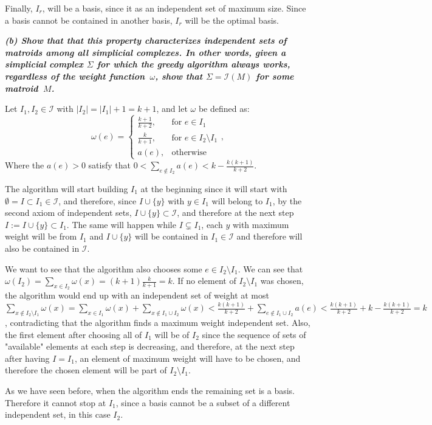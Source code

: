 Finally, $I_r$, will be a basis, since it as an independent set of maximum size. Since a basis cannot be contained in another basis, $I_r$ will be the optimal basis.
\vspace{3pt}

\hspace{5pt}\textbf{\textit{(b) Show that that this property characterizes independent sets of matroids among all simplicial complexes. In other words, given a simplicial complex $\Sigma$ for which the greedy algorithm always works, regardless of the weight function~$\omega$, show that $\Sigma = \mathcal I(M)$ for some matroid~$M$.}}

\vspace{3pt}

Let $I_1, I_2 \in \mathcal I$ with $|I_2| = |I_1| + 1 = k + 1$, and let $\omega$ be defined as:
\[
\omega(e) = \left\{
\begin{array}{lr}
	\frac{k+1}{k+2}, & \text{for } e \in I_1 \\
	\frac{k}{k+1}, & \text{for } e \in I_2 \setminus I_1\\
    a(e), & \text{otherwise }
\end{array}
\right. ,
\]
Where the $a(e) > 0$ satisfy that $0 < \sum_{e \notin I_2} a(e) < k - \frac{k(k+1)}{k+2}$.

The algorithm will start building $I_1$ at the beginning since it will start with $\emptyset = I \subset I_1 \in \mathcal I$, and therefore, since $I \cup \{y\}$ with $y \in I_1$ will belong to $I_1$, by the second axiom of independent sets, $I \cup \{y\} \subset \mathcal I$, and therefore at the next step $I := I \cup \{y\} \subset I_1$. The same will happen while $I \subsetneq I_1$, each $y$ with maximum weight will be from $I_1$ and $I \cup \{y\}$ will be contained in $I_1 \in \mathcal I$ and therefore will also be contained in $\mathcal I$.

We want to see that the algorithm also chooses some $e \in I_2 \setminus I_1$. We can see that $\omega(I_2) = \sum_{x \in I_2} \omega(x) = (k+1) \frac{k}{k+1} = k$. If no element of $I_2 \setminus I_1$ was chosen, the algorithm would end up with an independent set of weight at most $\sum_{x \notin I_2 \setminus I_1} \omega(x) = \sum_{x \in I_1} \omega(x) + \sum_{x \notin I_1 \cup I_2} \omega(x) < \frac{k(k+1)}{k+2} + \sum_{e \notin I_1 \cup I_2} a(e) <  \frac{k(k+1)}{k+2} + k - \frac{k(k+1)}{k+2} = k$, contradicting that the algorithm finds a maximum weight independent set. Also, the first element after choosing all of $I_1$ will be of $I_2$ since the sequence of sets of "available" elements at each step is decreasing, and therefore, at the next step after having $I = I_1$, an element of maximum weight will have to be chosen, and therefore the chosen element will be part of $I_2 \setminus I_1$.

As we have seen before, when the algorithm ends the remaining set is a basis. Therefore it cannot stop at $I_1$, since a basis cannot be a subset of a different independent set, in this case $I_2$.
